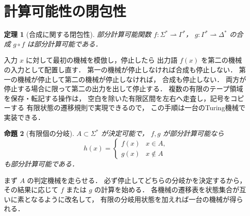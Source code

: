 \documentclass[a5paper,10pt,onecolumn]{jsarticle}
\makeatletter
\theoremstyle{mathnotetheorem}
\newtheorem{theorem}{定理}[section]
\newtheorem{proposition}[theorem]{命題}
\renewcommand{\proofname}{証明}
\renewenvironment{proof}[1][\proofname]{%
  \par\pushQED{\qed}\normalfont\topsep4\p@\@plus2\p@\relax
  \trivlist\item[\hskip\labelsep\bfseries #1]\ignorespaces
}{\popQED\endtrivlist\@endpefalse}
\makeatother
\begin{document}
\section{計算可能性の閉包性}
\begin{theorem}[合成に関する閉包性]\label{thm:compose}
部分計算可能関数 $f:\Sigma^*\rightharpoonup\Gamma^*$，
$g:\Gamma^*\rightharpoonup\Delta^*$ の合成
$g\circ f$ は部分計算可能である．
\end{theorem}
\begin{proof}
入力 $x$ に対して最初の機械を模倣し，停止したら
出力語 $f(x)$ を第二の機械の入力として配置し直す．
第一の機械が停止しなければ合成も停止しない．
第一の機械が停止して第二の機械が停止しなければ，
合成も停止しない．
両方が停止する場合に限って第二の出力を出して停止する．
複数の有限のテープ領域を保存・転記する操作は，
空白を除いた有限区間を左右へ走査し，記号をコピーする
有限状態の遷移規則で実現できるので，
この手順は一台のTuring機械で実装できる．
\end{proof}
\begin{proposition}[有限個の分岐]\label{prop:branch}
$A\subset\Sigma^*$ が決定可能で，
$f,g$ が部分計算可能なら
\[
 h(x)=\begin{cases}f(x)&x\in A,\\g(x)&x\notin A\end{cases}
\]
も部分計算可能である．
\end{proposition}
\begin{proof}
まず $A$ の判定機械を走らせる．
必ず停止してどちらの分岐かを決定するから，
その結果に応じて $f$ または $g$ の計算を始める．
各機械の遷移表を状態集合が互いに素となるように改名して，
有限の分岐用状態を加えれば一台の機械が得られる．
\end{proof}
\end{document}
